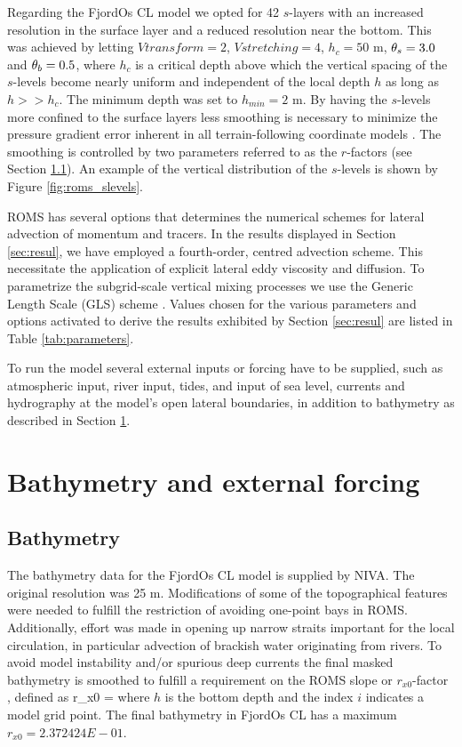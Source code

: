 Regarding the FjordOs CL model we opted for 42 $s$-layers with an increased resolution in the surface layer and a reduced resolution near the bottom. This was achieved by letting $Vtransform=2$, $Vstretching=4$, $h_c = 50$ m, $\theta_s = 3.0$ and $\theta_b = 0.5$, where $h_c$ is a critical depth above which the vertical spacing of the $s$-levels become nearly uniform and independent of the local depth $h$ as long as $h >> h_c$. The minimum depth was set to $h_{min}=2$ m. By having the $s$-levels more confined to the surface layers less smoothing is necessary to minimize the pressure gradient error inherent in all terrain-following coordinate models \citep{haney:1991}. The smoothing is controlled by two parameters referred to as the $r$-factors (see Section \ref{subsec:bathy}). An example of the vertical distribution of the $s$-levels is shown by Figure \ref{fig:roms_slevels}.


ROMS has several options that determines the numerical schemes for lateral advection of momentum and tracers. In the results displayed in Section \ref{sec:resul}, we have employed a fourth-order, centred advection scheme. This necessitate the application of explicit lateral eddy viscosity and diffusion. To parametrize the subgrid-scale vertical mixing processes we use the Generic Length Scale (GLS) scheme  \citep{umlau:burch:2003}. Values chosen for the various parameters and options activated to derive the results exhibited by Section \ref{sec:resul} are listed in Table \ref{tab:parameters}. 


To run the model several external inputs or forcing have to be supplied, such as atmospheric input, river input, tides, and input of sea level, currents and hydrography at the model's open lateral boundaries, in addition to bathymetry as described in Section \ref{sec:forcing}.   

\section{Bathymetry and external forcing}
\label{sec:forcing}
\subsection{Bathymetry}
\label{subsec:bathy}
The bathymetry data for the FjordOs CL model is supplied by NIVA. The original resolution was 25 m. Modifications of some of the topographical features were needed to fulfill the restriction of avoiding one-point bays in ROMS. Additionally, effort was made in opening up narrow straits important for the local circulation, in particular advection of brackish water originating from rivers. To avoid model instability and/or spurious deep currents the final masked bathymetry is smoothed to fulfill a requirement on the ROMS slope or $r_{x0}$-factor \citep{beckm:haidv:1993}, defined as
\be
 r_{x0} = 
\ee
where $h$ is the bottom depth and the index $i$ indicates a model grid point. The final bathymetry in FjordOs CL has a maximum $r_{x0} = 2.372424E-01$.

